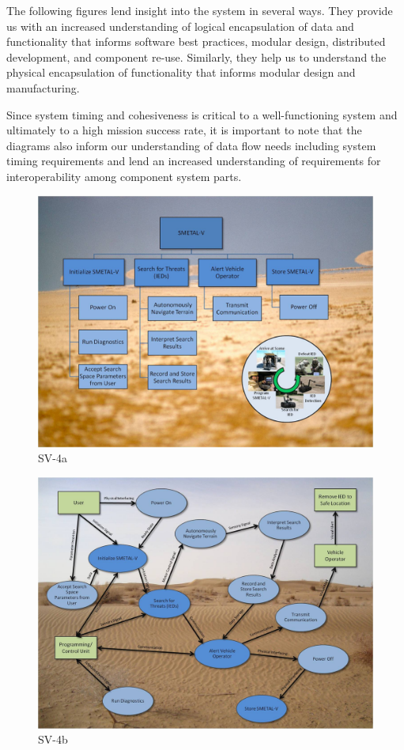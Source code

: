 \documentclass[letterpaper,10pt]{article}
\begin{document}
The following figures lend insight into the system in several ways.  They provide us with an increased understanding of logical encapsulation of data and functionality that informs software best practices, modular design, distributed development, and component re-use.  Similarly, they help us to understand the physical encapsulation of functionality that informs modular design and manufacturing.

Since system timing and cohesiveness is critical to a well-functioning system and ultimately to a high mission success rate, it is important to note that the diagrams also inform our understanding of data flow needs including system timing requirements and lend an increased understanding of requirements for interoperability among component system parts.

\begin{figure}[h!tbp]
	\begin{center}
		\includegraphics[scale=0.6]{sv4a.jpg}
		\caption{SV-4a}
	\end{center}
\end{figure}

\begin{figure}[h!tbp]
	\begin{center}
		\includegraphics[scale=0.6]{sv4b.jpg}
		\caption{SV-4b}
	\end{center}
\end{figure}
\end{document}
